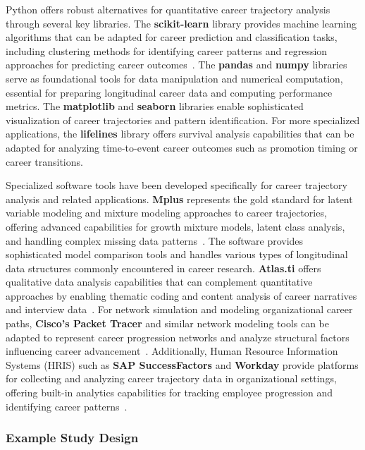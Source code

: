 \documentclass[main.tex]{subfiles}
\begin{document}
Python offers robust alternatives for quantitative career trajectory analysis through several key libraries. The \textbf{scikit-learn} library provides machine learning algorithms that can be adapted for career prediction and classification tasks, including clustering methods for identifying career patterns and regression approaches for predicting career outcomes~\parencite{karrierewege}. The \textbf{pandas} and \textbf{numpy} libraries serve as foundational tools for data manipulation and numerical computation, essential for preparing longitudinal career data and computing performance metrics. The \textbf{matplotlib} and \textbf{seaborn} libraries enable sophisticated visualization of career trajectories and pattern identification. For more specialized applications, the \textbf{lifelines} library offers survival analysis capabilities that can be adapted for analyzing time-to-event career outcomes such as promotion timing or career transitions.

Specialized software tools have been developed specifically for career trajectory analysis and related applications. \textbf{Mplus} represents the gold standard for latent variable modeling and mixture modeling approaches to career trajectories, offering advanced capabilities for growth mixture models, latent class analysis, and handling complex missing data patterns~\parencite{gmm_missing,residual_gmm}. The software provides sophisticated model comparison tools and handles various types of longitudinal data structures commonly encountered in career research. \textbf{Atlas.ti} offers qualitative data analysis capabilities that can complement quantitative approaches by enabling thematic coding and content analysis of career narratives and interview data~\parencite{performance_iot}. For network simulation and modeling organizational career paths, \textbf{Cisco's Packet Tracer} and similar network modeling tools can be adapted to represent career progression networks and analyze structural factors influencing career advancement~\parencite{performance_iot}. Additionally, Human Resource Information Systems (HRIS) such as \textbf{SAP SuccessFactors} and \textbf{Workday} provide platforms for collecting and analyzing career trajectory data in organizational settings, offering built-in analytics capabilities for tracking employee progression and identifying career patterns~\parencite{career_path_ratio}.

\subsubsection{Example Study Design}
\end{document}
